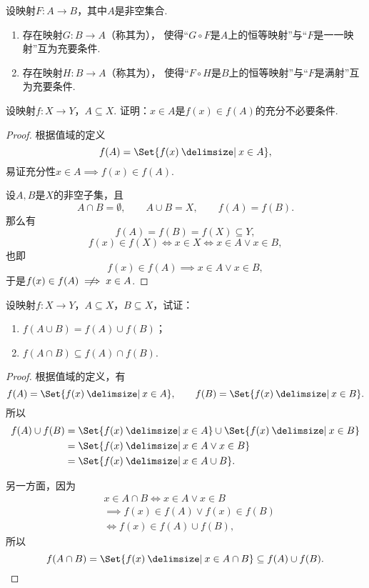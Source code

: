 \begin{theorem}
设映射\(F\colon A \to B\)，其中\(A\)是非空集合.
\begin{enumerate}
	\item 存在映射\(G\colon B \to A\)（称其为），
	使得“\(G \circ F\)是\(A\)上的恒等映射”与“\(F\)是一一映射”互为充要条件.

	\item 存在映射\(H\colon B \to A\)（称其为），
	使得“\(F \circ H\)是\(B\)上的恒等映射”与“\(F\)是满射”互为充要条件.
\end{enumerate}
\end{theorem}





\begin{example}
设映射\(f\colon X \to Y\)，\(A \subseteq X\).
证明：\(x \in A\)是\(f(x) \in f(A)\)的充分不必要条件.
\begin{proof}
根据值域的定义\[
	f(A) = \Set{ f(x) \given x \in A },
\]
易证充分性\(x \in A \implies f(x) \in f(A)\).

设\(A,B\)是\(X\)的非空子集，且\[
	A \cap B = \emptyset,
	\qquad
	A \cup B = X,
	\qquad
	f(A) = f(B).
\]那么有\[
	f(A) = f(B) = f(X) \subseteq Y,
\]\[
	f(x) \in f(X) \iff x \in X \iff x \in A \lor x \in B,
\]也即\[
	f(x) \in f(A) \implies x \in A \lor x \in B,
\]
于是\(f(x) \in f(A) \notimplies x \in A\).
\end{proof}
\end{example}

\begin{example}
设映射\(f\colon X \to Y\)，\(A \subseteq X\)，\(B \subseteq X\)，试证：\begin{enumerate}
	\item \(f(A \cup B) = f(A) \cup f(B)\)；
	\item \(f(A \cap B) \subseteq f(A) \cap f(B)\).
\end{enumerate}
\begin{proof}
\def\fran#1{ \Set{ f(x) \given #1 } }
根据值域的定义，有\[
	f(A) = \fran{x \in A},
	\qquad
	f(B) = \fran{x \in B}.
\]所以\[
	\begin{split}
		f(A) \cup f(B)
		&= \fran{x \in A} \cup \fran{x \in B} \\
		&= \fran{x \in A \lor x \in B} \\
		&= \fran{x \in A \cup B}.
	\end{split}
\]

另一方面，因为\[
	\begin{split}
		&x \in A \cap B
		\iff
		x \in A \lor x \in B \\
		&\implies
		f(x) \in f(A) \lor f(x) \in f(B) \\
		&\iff
		f(x) \in f(A) \cup f(B),
	\end{split}
\]所以\[
	f(A \cap B) = \fran{x \in A \cap B}
	\subseteq f(A) \cup f(B).
	\qedhere
\]
\end{proof}
\end{example}

